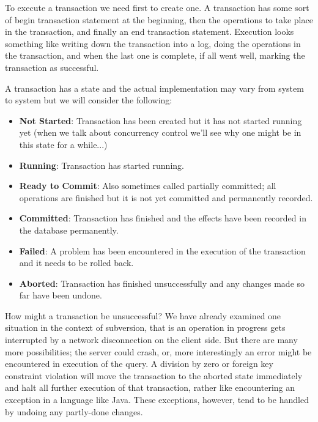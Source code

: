 To execute a transaction we need first to create one. A transaction has some sort of begin transaction statement at the beginning, then the operations to take place in the transaction, and finally an end transaction statement. Execution looks something like writing down the transaction into a log, doing the operations in the transaction, and when the last one is complete, if all went well, marking the transaction as successful. 

A transaction has a state and the actual implementation may vary from system to system but we will consider the following:
\begin{itemize}
\item \textbf{Not Started}: Transaction has been created but it has not started running yet (when we talk about concurrency control we'll see why one might be in this state for a while...)
\item \textbf{Running}: Transaction has started running.
\item \textbf{Ready to Commit}: Also sometimes called partially committed; all operations are finished but it is not yet committed and permanently recorded.
\item \textbf{Committed}: Transaction has finished and the effects have been recorded in the database permanently.
\item \textbf{Failed}: A problem has been encountered in the execution of the transaction and it needs to be rolled back.
\item \textbf{Aborted}: Transaction has finished unsuccessfully and any changes made so far have been undone. 
\end{itemize}

How might a transaction be unsuccessful? We have already examined one situation in the context of subversion, that is an operation in progress gets interrupted by a network disconnection on the client side. But there are many more possibilities; the server could crash, or, more interestingly an error might be encountered in execution of the query. A division by zero or foreign key constraint violation will move the transaction to the aborted state immediately and halt all further execution of that transaction, rather like encountering an exception in a language like Java. These exceptions, however, tend to be handled by undoing any partly-done changes.


